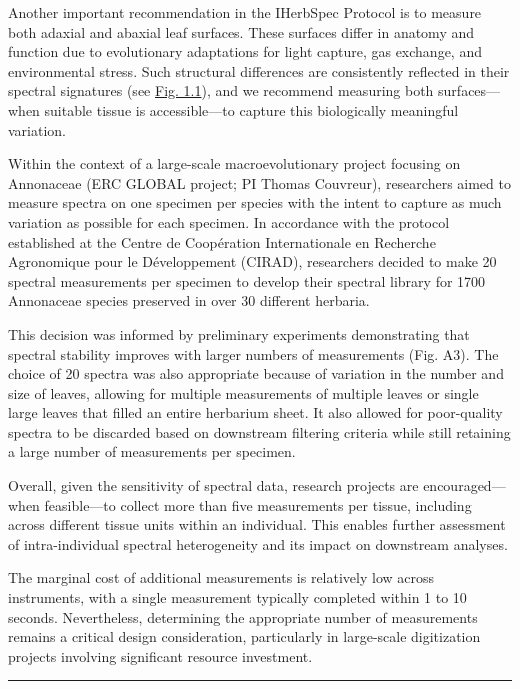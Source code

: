 \documentclass[
  letterpaper,
  DIV=11,
  numbers=noendperiod]{scrreprt}
\begin{document}
Another important recommendation in the IHerbSpec Protocol is to measure
both adaxial and abaxial leaf surfaces. These surfaces differ in anatomy
and function due to evolutionary adaptations for light capture, gas
exchange, and environmental stress. Such structural differences are
consistently reflected in their spectral signatures (see
\hyperref[part-1-overview]{Fig. 1.1}), and we recommend measuring both
surfaces---when suitable tissue is accessible---to capture this
biologically meaningful variation.

Within the context of a large-scale macroevolutionary project focusing
on Annonaceae (ERC GLOBAL project; PI Thomas Couvreur), researchers
aimed to measure spectra on one specimen per species with the intent to
capture as much variation as possible for each specimen. In accordance
with the protocol established at the Centre de Coopération
Internationale en Recherche Agronomique pour le Développement (CIRAD),
researchers decided to make 20 spectral measurements per specimen to
develop their spectral library for 1700 Annonaceae species preserved in
over 30 different herbaria.

This decision was informed by preliminary experiments demonstrating that
spectral stability improves with larger numbers of measurements (Fig.
A3). The choice of 20 spectra was also appropriate because of variation
in the number and size of leaves, allowing for multiple measurements of
multiple leaves or single large leaves that filled an entire herbarium
sheet. It also allowed for poor-quality spectra to be discarded based on
downstream filtering criteria while still retaining a large number of
measurements per specimen.

Overall, given the sensitivity of spectral data, research projects are
encouraged---when feasible---to collect more than five measurements per
tissue, including across different tissue units within an individual.
This enables further assessment of intra-individual spectral
heterogeneity and its impact on downstream analyses.

The marginal cost of additional measurements is relatively low across
instruments, with a single measurement typically completed within 1 to
10 seconds. Nevertheless, determining the appropriate number of
measurements remains a critical design consideration, particularly in
large-scale digitization projects involving significant resource
investment.

\begin{center}\rule{0.5\linewidth}{0.5pt}\end{center}
\end{document}
